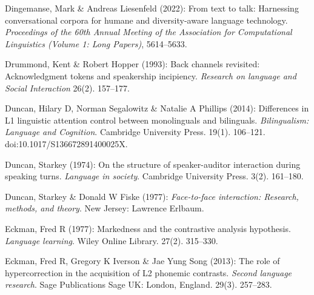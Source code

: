 \begin{styleBibliography}
Dingemanse, Mark \& Andreas Liesenfeld (2022): From text to talk: Harnessing conversational corpora for humane and diversity-aware language technology. \textit{Proceedings of the 60th Annual Meeting of the Association for Computational Linguistics (Volume 1: Long Papers)}, 5614–5633.
\end{styleBibliography}

\begin{styleBibliography}
Drummond, Kent \& Robert Hopper (1993): Back channels revisited: Acknowledgment tokens and speakership incipiency. \textit{Research on language and Social Interaction} 26(2). 157–177.
\end{styleBibliography}

\begin{styleBibliography}
Duncan, Hilary D, Norman Segalowitz \& Natalie A Phillips (2014): Differences in L1 linguistic attention control between monolinguals and bilinguals. \textit{Bilingualism: Language and Cognition}. Cambridge University Press. 19(1). 106–121. doi:10.1017/S136672891400025X.
\end{styleBibliography}

\begin{styleBibliography}
Duncan, Starkey (1974): On the structure of speaker-auditor interaction during speaking turns. \textit{Language in society}. Cambridge University Press. 3(2). 161–180.
\end{styleBibliography}

\begin{styleBibliography}
Duncan, Starkey \& Donald W Fiske (1977): \textit{Face-to-face interaction: Research, methods, and theory}. New Jersey: Lawrence Erlbaum.
\end{styleBibliography}

\begin{styleBibliography}
Eckman, Fred R (1977): Markedness and the contrastive analysis hypothesis. \textit{Language learning}. Wiley Online Library. 27(2). 315–330.
\end{styleBibliography}

\begin{styleBibliography}
Eckman, Fred R, Gregory K Iverson \& Jae Yung Song (2013): The role of hypercorrection in the acquisition of L2 phonemic contrasts. \textit{Second language research}. Sage Publications Sage UK: London, England. 29(3). 257–283.
\end{styleBibliography}

